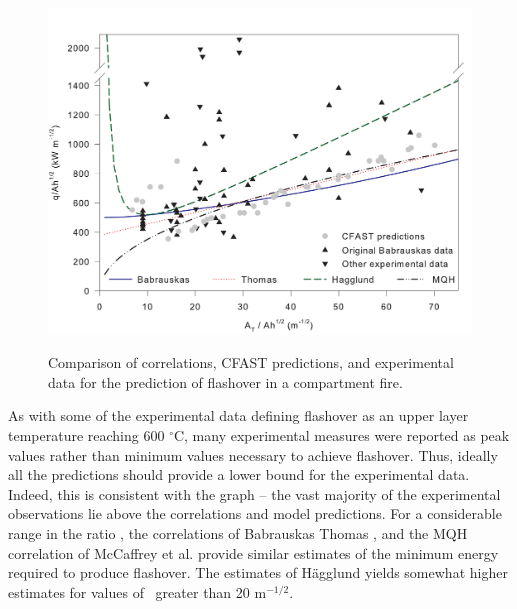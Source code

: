 \begin{figure}
\begin{center}
\includegraphics[width=5.0000in]{FIGURES/flashover.pdf}\\
\end{center}
\caption{Comparison of correlations, CFAST predictions, and experimental data for the prediction of flashover in a compartment fire.}
 \label{figValidFlashover}
\end{figure}

As with some of the experimental data defining flashover as an upper layer temperature reaching 600 $^{\circ}$C, many experimental measures were reported as peak values rather than minimum values necessary to achieve flashover. Thus, ideally all the predictions should provide a lower bound for the experimental data. Indeed, this is consistent with the graph -- the vast majority of the experimental observations lie above the correlations and model predictions. For a considerable range in the ratio \asqh, the correlations of Babrauskas \cite{Valid:Babrauskas_Flashover} Thomas \cite{Thomas:1981fk}, and the MQH correlation of McCaffrey et al. \cite{McCaffrey:1981uq} provide similar estimates of the minimum energy required to produce flashover. The estimates of H\"{a}gglund \cite{Hagglund:1980} yields somewhat higher estimates for values of \asqh  \, greater than 20 m$^{-1/2}$.

